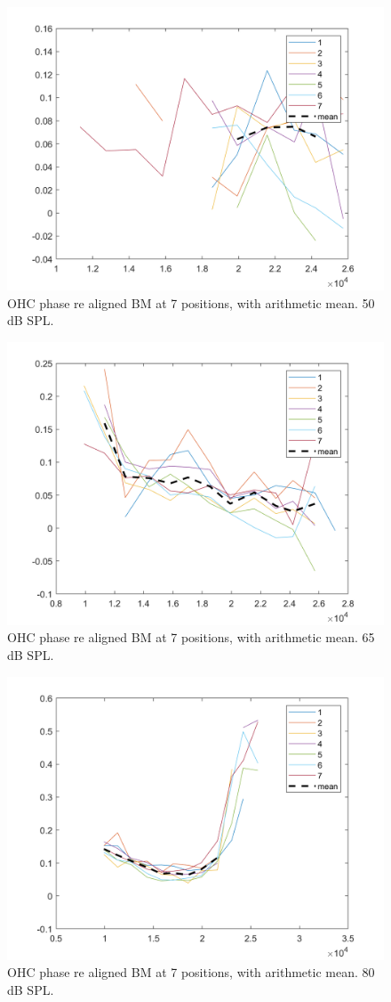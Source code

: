 \documentclass{article}
\begin{document}
\begin{figure}
	\centering
	\includegraphics[width=.7\textwidth]{Figures/ohcdcbm50.png}
	\caption{OHC phase re aligned BM at 7 positions, with arithmetic mean. 50 dB SPL.}
	\label{ohcdcbm50}
\end{figure}

\begin{figure}
	\centering
	\includegraphics[width=.7\textwidth]{Figures/ohcdcbm65.png}
	\caption{OHC phase re aligned BM at 7 positions, with arithmetic mean. 65 dB SPL.}
	\label{ohcdcbm65}
\end{figure}

\begin{figure}
	\centering
	\includegraphics[width=.7\textwidth]{Figures/ohcdcbm80.png}
	\caption{OHC phase re aligned BM at 7 positions, with arithmetic mean. 80 dB SPL.}
	\label{ohcdcbm80}
\end{figure}
\end{document}
